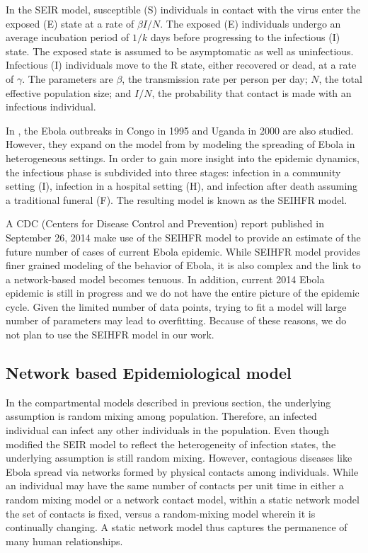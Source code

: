 \documentclass[10pt, journal,onecolumn]{IEEEtran}
\begin{document}
In the SEIR model, susceptible (S) individuals in contact with the virus enter the exposed (E) state
at a rate of $\beta I / N$.
The exposed (E) individuals undergo an average incubation period of $1/k$ days before progressing to
the infectious (I) state. The exposed state is assumed to be asymptomatic as well as uninfectious.
Infectious (I) individuals move to the R state, either recovered or dead, at a rate of $\gamma$.
 The parameters are $\beta$, the transmission rate per person per day;
$N$, the total effective population size; and $I/N$, the probability that contact is made with
an infectious individual.

In \citep{legrand2007understanding}, the Ebola outbreaks in Congo in 1995 and Uganda in 2000
are also studied. However, they expand on the model from \citep{chowell2004basic} by modeling the spreading of Ebola in heterogeneous settings. In order to gain more insight into the epidemic dynamics,
the infectious phase is subdivided into three stages: infection in a community setting (I), infection in a hospital setting (H), and infection after death assuming a traditional funeral (F). The resulting model is known
as the SEIHFR model. 

A CDC (Centers for Disease Control and Prevention) report \citep{meltzer2014estimating} published in September 26, 2014 make use of the SEIHFR model to provide an estimate of the future number of cases of current Ebola epidemic. While SEIHFR model provides finer grained modeling of the behavior of Ebola, it is also complex and the link to a network-based model becomes tenuous. In addition, current 2014 Ebola epidemic is still in progress and we do not have the entire picture of the epidemic cycle. Given the limited number of data points, trying to fit a model will large number of parameters may lead to overfitting.  Because of these reasons, we do not plan to use the SEIHFR model in our work.

\subsection{\textbf{Network based Epidemiological model}}

In the compartmental models described in previous section, the underlying assumption is random mixing among population. Therefore, an infected individual can infect any other individuals in the population. Even though \citep{legrand2007understanding} modified the SEIR model to reflect the heterogeneity of infection states, the underlying assumption is still random mixing. However, contagious diseases like Ebola spread via networks formed by physical contacts among individuals. While an individual may have the same number of contacts per unit time in either a random mixing model or a network contact model, within a static network model the set of
contacts is fixed, versus a random-mixing model wherein it is continually changing. A static network model thus captures the permanence of many human relationships. 
\end{document}

